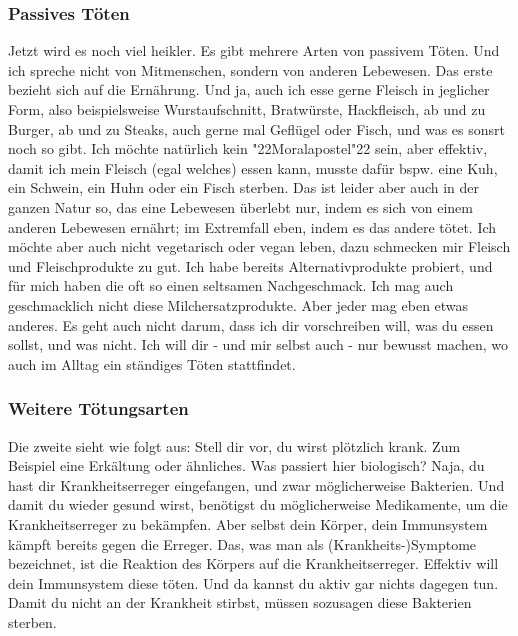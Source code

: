 \documentclass[12pt,a5paper]{article}
\newcommand{\q}[1]{\char"22{#1}\char"22 }
\begin{document}
	\subsubsection{Passives T\"oten}
		Jetzt wird es noch viel heikler.
		Es gibt mehrere Arten von passivem T\"oten.
		Und ich spreche nicht von Mitmenschen,
		sondern von anderen Lebewesen.
		Das erste bezieht sich auf die Ern\"ahrung.
		Und ja,
		auch ich esse gerne Fleisch in jeglicher Form,
		also beispielsweise Wurstaufschnitt,
		Bratw\"urste,
		Hackfleisch,
		ab und zu Burger,
		ab und zu Steaks,
		auch gerne mal Gefl\"ugel oder Fisch,
		und was es sonsrt noch so gibt.
		Ich m\"ochte nat\"urlich kein \q{Moralapostel} sein,
		aber effektiv,
		damit ich mein Fleisch (egal welches) essen kann,
		musste daf\"ur bspw. eine Kuh,
		ein Schwein,
		ein Huhn oder ein Fisch sterben.
		Das ist leider aber auch in der ganzen Natur so,
		das eine Lebewesen \"uberlebt nur,
		indem es sich von einem anderen Lebewesen ern\"ahrt;
		im Extremfall eben,
		indem es das andere t\"otet.
		Ich m\"ochte aber auch nicht vegetarisch oder vegan leben,
		dazu schmecken mir Fleisch und Fleischprodukte zu gut.
		Ich habe bereits Alternativprodukte probiert,
		und f\"ur mich haben die oft so einen seltsamen Nachgeschmack.
		Ich mag auch geschmacklich nicht diese Milchersatzprodukte.
		Aber jeder mag eben etwas anderes.
		Es geht auch nicht darum,
		dass ich dir vorschreiben will,
		was du essen sollst,
		und was nicht.
		Ich will dir - und mir selbst auch - nur bewusst machen,
		wo auch im Alltag ein st\"andiges T\"oten stattfindet.
		
	\subsubsection{Weitere T\"otungsarten}
		Die zweite sieht wie folgt aus:
		Stell dir vor,
		du wirst pl\"otzlich krank.
		Zum Beispiel eine Erk\"altung oder \"ahnliches.
		Was passiert hier biologisch?
		Naja,
		du hast dir Krankheitserreger eingefangen,
		und zwar m\"oglicherweise Bakterien.
		Und damit du wieder gesund wirst,
		ben\"otigst du m\"oglicherweise Medikamente,
		um die Krankheitserreger zu bek\"ampfen.
		Aber selbst dein K\"orper,
		dein Immunsystem k\"ampft bereits gegen die Erreger.
		Das,
		was man als (Krankheits-)Symptome bezeichnet,
		ist die Reaktion des K\"orpers auf die Krankheitserreger.
		Effektiv will dein Immunsystem diese t\"oten.
		Und da kannst du aktiv gar nichts dagegen tun.
		Damit du nicht an der Krankheit stirbst,
		m\"ussen sozusagen diese Bakterien sterben.
\end{document}
